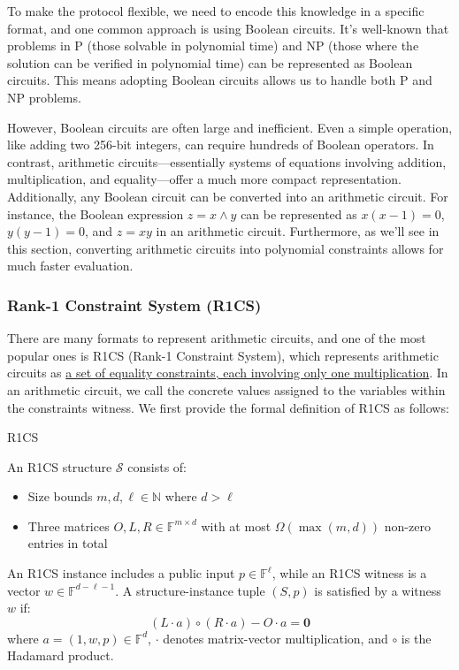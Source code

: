 \documentclass{article}
\begin{document}
To make the protocol flexible, we need to encode this knowledge in a specific format, and one common approach is using Boolean circuits. It's well-known that problems in P (those solvable in polynomial time) and NP (those where the solution can be verified in polynomial time) can be represented as Boolean circuits. This means adopting Boolean circuits allows us to handle both P and NP problems.

However, Boolean circuits are often large and inefficient. Even a simple operation, like adding two 256-bit integers, can require hundreds of Boolean operators. In contrast, arithmetic circuits—essentially systems of equations involving addition, multiplication, and equality—offer a much more compact representation. Additionally, any Boolean circuit can be converted into an arithmetic circuit. For instance, the Boolean expression $z = x \land y$ can be represented as $x(x-1) = 0$, $y(y-1) = 0$, and $z = xy$ in an arithmetic circuit. Furthermore, as we'll see in this section, converting arithmetic circuits into polynomial constraints allows for much faster evaluation.

\subsubsection{Rank-1 Constraint System (R1CS)}

There are many formats to represent arithmetic circuits, and one of the most popular ones is R1CS (Rank-1 Constraint System), which represents arithmetic circuits as \underline{a set of equality constraints, each involving only one multiplication}. In an arithmetic circuit, we call the concrete values assigned to the variables within the constraints witness. We first provide the formal definition of R1CS as follows:

\begin{definition}{R1CS}{}

An R1CS structure $\mathcal{S}$ consists of:
\begin{itemize}
\item Size bounds $m, d, \ell \in \mathbb{N}$ where $d > \ell$
\item Three matrices $O, L, R \in \mathbb{F}^{m\times d}$ with at most $ \Omega(\max(m, d))$ non-zero entries in total
\end{itemize}

An R1CS instance includes a public input $p \in \mathbb{F}^\ell$, while an R1CS witness is a vector $w \in \mathbb{F}^{d - \ell - 1}$.
A structure-instance tuple $(S, p)$ is satisfied by a witness $w$ if:
\begin{equation}
(L \cdot a) \circ (R \cdot a) - O \cdot a = \mathbf{0}
\end{equation}
where $a = (1, w, p) \in \mathbb{F}^d$, $\cdot$ denotes matrix-vector multiplication, and $\circ$ is the Hadamard product.

\end{definition}
\end{document}
